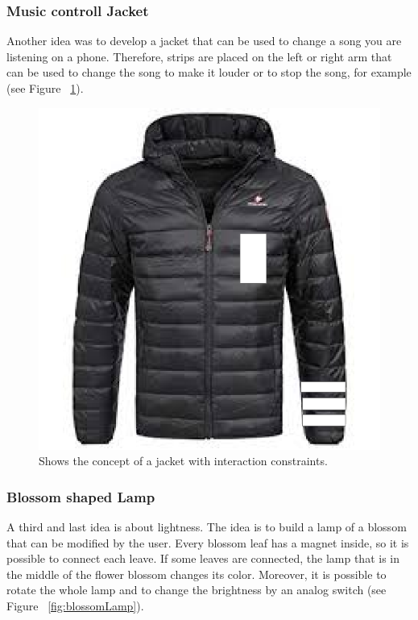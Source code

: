 \documentclass[doc.tex]{subfiles}
\begin{document}
    \subsubsection{Music controll Jacket}
    \begin{flushleft}
        Another idea was to develop a jacket that can be used to change a song you are listening on a phone. Therefore,
        strips are placed on the left or right arm that can be used to change the song to make it louder or to stop the song, 
        for example (see Figure ~\ref{fig:jacketIdea}).
    \end{flushleft}

    \begin{figure}[h!]
        \centering
        \includegraphics[scale=0.2]{images/projectideas/jacket.png}
        \caption{Shows the concept of a jacket with interaction constraints.}
        \label{fig:jacketIdea}
    \end{figure}

    \subsubsection{Blossom shaped Lamp}
    \label{BlossomShapedLamp}
    \begin{flushleft}
        A third and last idea is about lightness. The idea is to build a lamp of a blossom that can be modified by the user.
        Every blossom leaf has a magnet inside, so it is possible to connect each leave. If some leaves are connected, the lamp that 
        is in the middle of the flower blossom changes its color. Moreover, it is possible to rotate the whole lamp and to change the
        brightness by an analog switch (see Figure ~\ref{fig:blossomLamp}).
    \end{flushleft}
\end{document}
